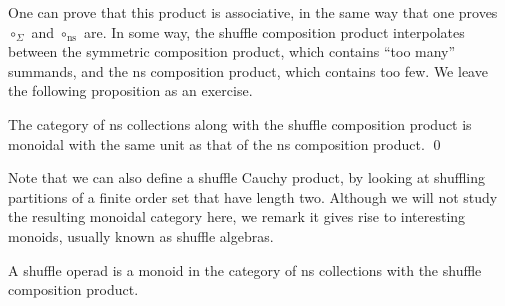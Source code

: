 One can prove that this product is
associative, in the same way that one
proves $\circ_\Sigma$ and $\circ_\mathrm{ns}$
are. In some way, the shuffle composition
product interpolates between the symmetric
composition product, which contains ``too
many'' summands, and the ns composition
product, which contains too few. We
leave the following proposition as an exercise.

\begin{proposition}
The category of ns collections along with
the shuffle composition product is 
monoidal with the same unit as that of the
ns composition product. \qed
\end{proposition}

Note that we can also define a shuffle
Cauchy product, by looking at shuffling
partitions of a finite order set that
have length two. Although we will not study
the resulting monoidal category here,
we remark it gives rise to interesting
monoids, usually known as shuffle algebras.

\begin{definition}
A shuffle operad is a monoid in the category of 
ns collections with the shuffle composition 
product. 
\end{definition}

